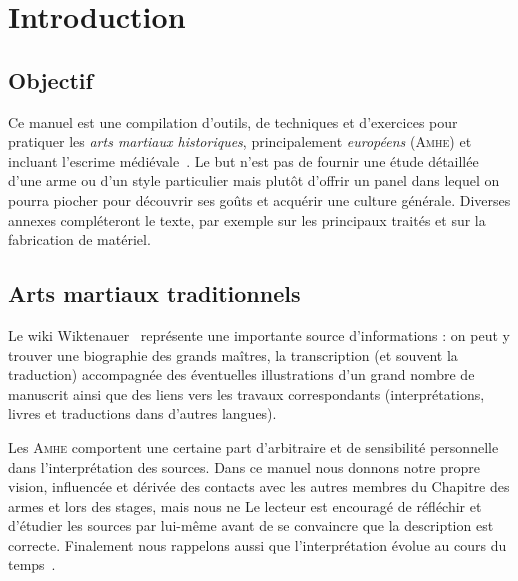\chapter{Introduction}


\section{Objectif}


Ce manuel est une compilation d'outils, de techniques et d'exercices pour pratiquer les \emph{arts martiaux historiques}, principalement \emph{européens} (\textsc{Amhe}) et incluant l'escrime médiévale~\footnotemark{}.
Le but n'est pas de fournir une étude détaillée d'une arme ou d'un style particulier mais plutôt d'offrir un panel dans lequel on pourra piocher pour découvrir ses goûts et acquérir une culture générale.
Diverses annexes compléteront le texte, par exemple sur les principaux traités et sur la fabrication de matériel.


\section{Arts martiaux traditionnels}




Le wiki Wiktenauer~\cite{wiktenauer} représente une importante source d'informations : on peut y trouver une biographie des grands maîtres, la transcription (et souvent la traduction) accompagnée des éventuelles illustrations d'un grand nombre de manuscrit ainsi que des liens vers les travaux correspondants (interprétations, livres et traductions dans d'autres langues).

Les \textsc{Amhe} comportent une certaine part d'arbitraire et de sensibilité personnelle dans l'interprétation des sources.
Dans ce manuel nous donnons notre propre vision, influencée et dérivée des contacts avec les autres membres du Chapitre des armes et lors des stages, mais nous ne 
Le lecteur est encouragé de réfléchir et d'étudier les sources par lui-même avant de se convaincre que la description est correcte.
Finalement nous rappelons aussi que l'interprétation évolue au cours du temps~\footnotemark{}.

